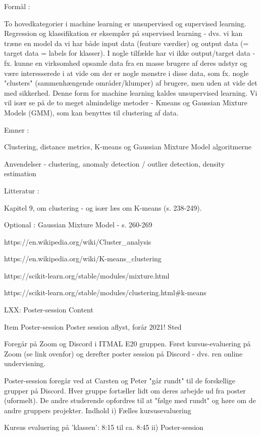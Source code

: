     Formål :

    To hovedkategorier i machine learning er unsupervised og supervised learning. Regression og klassifikation er eksempler på supervised learning - dvs. vi kan træne en model da vi har både input data (feature værdier) og output data (= target data = labels for klasser). I nogle tilfælde har vi ikke output/target data - fx.  kunne en virksomhed opsamle data fra en masse brugere af deres udstyr og være interesserede i at vide om der er nogle mønstre i disse data, som fx. nogle "clusters" (sammenhængende områder/klumper) af brugere, men uden at vide det med sikkerhed. Denne form for machine learning kaldes unsupervised learning. Vi vil især se på de to meget almindelige metoder - Kmeans og Gaussian Mixture Models (GMM), som kan benyttes til clustering af data.


    Emner :

    Clustering, distance metrics, K-means og Gaussian Mixture Model algoritmerne

    Anvendelser - clustering, anomaly detection / outlier detection, density estimation


    Litteratur :

    Kapitel 9, om clustering - og især læs om K-means (s. 238-249).

    Optional : Gaussian Mixture Model - s. 260-269

    https://en.wikipedia.org/wiki/Cluster_analysis

    https://en.wikipedia.org/wiki/K-means_clustering

    https://scikit-learn.org/stable/modules/mixture.html

    https://scikit-learn.org/stable/modules/clustering.html#k-means


LXX: Poster-session
Content

    Item
    Poster-session
    Poster session aflyst, forår 2021!
    Sted

    Foregår på Zoom og Discord i ITMAL E20 gruppen. Først kursus-evaluering på Zoom (se link ovenfor) og derefter poster session på Discord - dvs. ren online undervisning.

    Poster-session foregår ved at Carsten og Peter "går rundt" til de forskellige grupper på Discord. Hver gruppe fortæller lidt om deres arbejde ud fra poster (uformelt). De andre studerende opfordres til at "følge med rundt" og høre om de andre gruppers projekter.
    Indhold
    i) Fælles kursusevaluering

    Kursus evaluering på 'klassen': 8:15 til ca. 8:45
    ii) Poster-session

